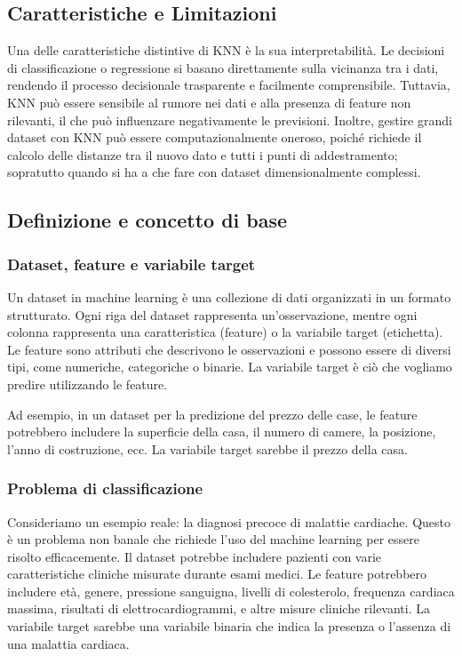 \subsection{Caratteristiche e Limitazioni}

Una delle caratteristiche distintive di KNN è la sua interpretabilità. Le decisioni di 
classificazione o regressione si basano direttamente sulla vicinanza tra i dati, rendendo 
il processo decisionale trasparente e facilmente comprensibile. Tuttavia, KNN può essere 
sensibile al rumore nei dati e alla presenza di feature non rilevanti, il che può influenzare 
negativamente le previsioni. Inoltre, gestire grandi dataset con KNN può essere computazionalmente 
oneroso, poiché richiede il calcolo delle distanze tra il nuovo dato e tutti i punti di addestramento; 
sopratutto quando si ha a che fare con dataset dimensionalmente complessi.

\subsection{Definizione e concetto di base}

\subsubsection{Dataset, feature e variabile target}

Un dataset in machine learning è una collezione di dati organizzati in un formato strutturato. Ogni riga del dataset rappresenta un'osservazione, mentre ogni colonna rappresenta una caratteristica (feature) o la variabile target (etichetta). Le feature sono attributi che descrivono le osservazioni e possono essere di diversi tipi, come numeriche, categoriche o binarie. La variabile target è ciò che vogliamo predire utilizzando le feature.

Ad esempio, in un dataset per la predizione del prezzo delle case, le feature potrebbero includere la superficie della casa, il numero di camere, la posizione, l'anno di costruzione, ecc. La variabile target sarebbe il prezzo della casa.

\subsubsection{Problema di classificazione}

Consideriamo un esempio reale: la diagnosi precoce di malattie cardiache. Questo è un problema non banale che richiede l'uso del machine learning per essere risolto efficacemente. Il dataset potrebbe includere pazienti con varie caratteristiche cliniche misurate durante esami medici. Le feature potrebbero includere età, genere, pressione sanguigna, livelli di colesterolo, frequenza cardiaca massima, risultati di elettrocardiogrammi, e altre misure cliniche rilevanti. La variabile target sarebbe una variabile binaria che indica la presenza o l'assenza di una malattia cardiaca.

